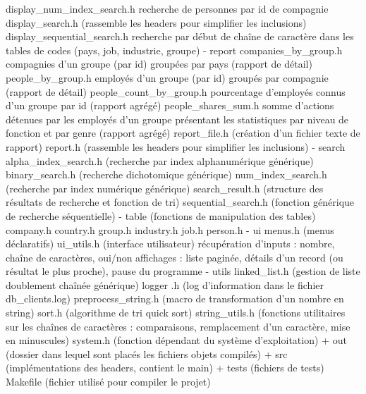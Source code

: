 \documentclass{article}
\begin{document}
\begin{verbatimtab}
            display_num_index_search.h
                recherche de personnes par id de compagnie
            display_search.h (rassemble les headers pour simplifier les inclusions)
            display_sequential_search.h
                recherche par début de chaîne de caractère dans les tables de codes
                (pays, job, industrie, groupe)
        - report
            companies_by_group.h
                compagnies d'un groupe (par id) groupées par pays (rapport de détail)
            people_by_group.h
                employés d'un groupe (par id) groupés par compagnie (rapport de détail)
            people_count_by_group.h
                pourcentage d'employés connus d'un groupe par id (rapport agrégé)
            people_shares_sum.h
                somme d'actions détenues par les employés d'un groupe présentant
                les statistiques par niveau de fonction et par genre (rapport agrégé)
            report_file.h (création d'un fichier texte de rapport)
            report.h (rassemble les headers pour simplifier les inclusions)
        - search
            alpha_index_search.h (recherche par index alphanumérique générique)
            binary_search.h (recherche dichotomique générique)
            num_index_search.h (recherche par index numérique générique)
            search_result.h (structure des résultats de recherche et fonction de tri)
            sequential_search.h (fonction générique de recherche séquentielle)
        - table (fonctions de manipulation des tables)
            company.h
            country.h
            group.h
            industry.h
            job.h
            person.h
        - ui
            menus.h (menus déclaratifs)
            ui_utils.h (interface utilisateur)
                récupération d'inputs : nombre, chaîne de caractères, oui/non
                affichages : liste paginée, détails d'un record (ou résultat
                    le plus proche), pause du programme
        - utils
            linked_list.h (gestion de liste doublement chaînée générique)
            logger  .h (log d'information dans le fichier db_clients.log)
            preprocess_string.h (macro de transformation d'un nombre en string)
            sort.h (algorithme de tri quick sort)
            string_utils.h (fonctions utilitaires sur les chaînes de caractères :
                comparaisons, remplacement d'un caractère, mise en minuscules)
            system.h (fonction dépendant du système d'exploitation)
    + out (dossier dans lequel sont placés les fichiers objets compilés)
    + src (implémentations des headers, contient le main)
    + tests (fichiers de tests)
    Makefile (fichier utilisé pour compiler le projet)
    \end{verbatimtab}
\end{document}
